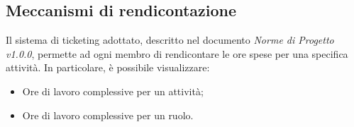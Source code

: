 \subsection{Meccanismi di rendicontazione}
Il sistema di ticketing adottato, descritto nel documento \emph{Norme di Progetto v1.0.0}, permette ad ogni membro di rendicontare le ore spese per una specifica attività. In particolare, è possibile visualizzare:
\begin{itemize}
\item{Ore di lavoro complessive per un attività;}
\item{Ore di lavoro complessive per un ruolo.}
\end{itemize}
\pagebreak
